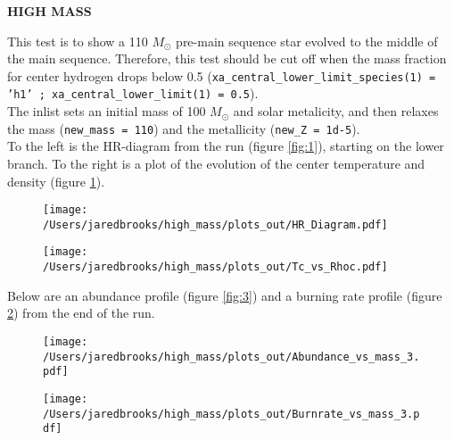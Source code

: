 \documentclass{article}
\begin{document}
	
	\begin{center}
	  \begin{Large}
	    \textbf{HIGH MASS}\\
	  \end{Large}
	\end{center}

        This test is to show a 110 $M_\odot$ pre-main sequence star evolved to the middle of the main sequence.  Therefore, this test should be cut off when the mass fraction for center hydrogen drops below 0.5 (\texttt{xa\_central\_lower\_limit\_species(1) = 'h1' ; xa\_central\_lower\_limit(1) = 0.5}).\\

        The inlist sets an initial mass of 100 $M_\odot$ and solar metalicity, and then relaxes the mass (\texttt{new\_mass = 110}) and the metallicity (\texttt{new\_Z = 1d-5}).\\

        To the left is the HR-diagram from the run (figure \ref{fig:1}), starting on the lower branch.  To the right is a plot of the evolution of the center temperature and density (figure \ref{fig:2}).

        \begin{figure}[H]
          \begin{minipage}[b]{0.5\linewidth}
	    \centering
	    \texttt{[image: /Users/jaredbrooks/high\_mass/plots\_out/HR\_Diagram.pdf]}
	    \caption{}
	    \label{fig:1}
          \end{minipage}
          \hspace{0cm}
          \begin{minipage}[b]{0.5\linewidth}
            \centering
            \texttt{[image: /Users/jaredbrooks/high\_mass/plots\_out/Tc\_vs\_Rhoc.pdf]}
            \caption{}
            \label{fig:2}
          \end{minipage}
	\end{figure}

        \pagebreak

        Below are an abundance profile (figure \ref{fig:3}) and a burning rate profile (figure \ref{fig:4}) from the end of the run.

        \begin{figure}[H]
            \begin{minipage}[b]{0.5\linewidth}
            \centering
            \texttt{[image: /Users/jaredbrooks/high\_mass/plots\_out/Abundance\_vs\_mass\_3.pdf]}
            \caption{}
            \label{fig:3}
          \end{minipage}
          \hspace{0cm}
          \begin{minipage}[b]{0.5\linewidth}
            \centering
            \texttt{[image: /Users/jaredbrooks/high\_mass/plots\_out/Burnrate\_vs\_mass\_3.pdf]}
            \caption{}
            \label{fig:4}
          \end{minipage}
        \end{figure}
\end{document}
